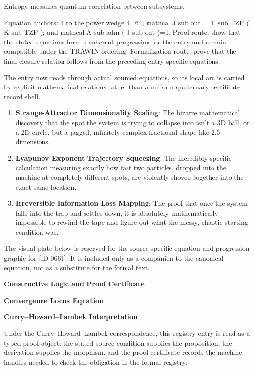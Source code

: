 Entropy measures quantum correlation between subsystems.

Equation anchors: 4 to the power wedge 3=64; mathcal J sub out = T sub TZP ( K sub TZP ); and mathcal A sub adm ( J sub out )=1. Proof route: show that the stated equations form a coherent progression for the entry and remain compatible under the TRAWIN ordering. Formalization route: prove that the final closure relation follows from the preceding entry-specific equations.

The entry now reads through actual sourced equations, so its local arc is carried by explicit mathematical relations rather than a uniform quaternary certificate record shell.
\endgroup

\begin{enumerate}[leftmargin=1.6em,itemsep=6pt,topsep=4pt]
\item \textbf{Strange-Attractor Dimensionality Scaling}: The bizarre mathematical discovery that the spot the system is trying to collapse into isn't a 3D ball, or a 2D circle, but a jagged, infinitely complex fractional shape like 2.5 dimensions.
\item \textbf{Lyapunov Exponent Trajectory Squeezing}: The incredibly specific calculation measuring exactly how fast two particles, dropped into the machine at completely different spots, are violently shoved together into the exact same location.
\item \textbf{Irreversible Information Loss Mapping}: The proof that once the system falls into the trap and settles down, it is absolutely, mathematically impossible to rewind the tape and figure out what the messy, chaotic starting condition was.
\end{enumerate}

\begingroup\footnotesize\sloppy
The visual plate below is reserved for the source-specific equation and progression graphic for [ID 0661]. It is included only as a companion to the canonical equation, not as a substitute for the formal text.
\par\endgroup
\ifTZPDarkEdition
{}
\fi

\clearpage
\begingroup\tzpsupportsetup
\noindent\textbf{\fontsize{10.8pt}{12.8pt}\selectfont [ID 0661] Constructive Logic and Proof Certificate}\par
\noindent\textbf{\fontsize{10pt}{12pt}\selectfont Convergence Locus Equation}\par
\vspace{0.45em}
\begingroup
\footnotesize
\setlength{\parskip}{0.22em}
\setlength{\parindent}{0pt}
\noindent\textbf{Curry--Howard--Lambek Interpretation}\par
Under the Curry--Howard--Lambek correspondence, this registry entry is read as a typed proof
object: the stated source condition supplies the proposition, the derivation supplies the
morphism, and the proof certificate records the machine handles needed to check the obligation
in the formal registry.

